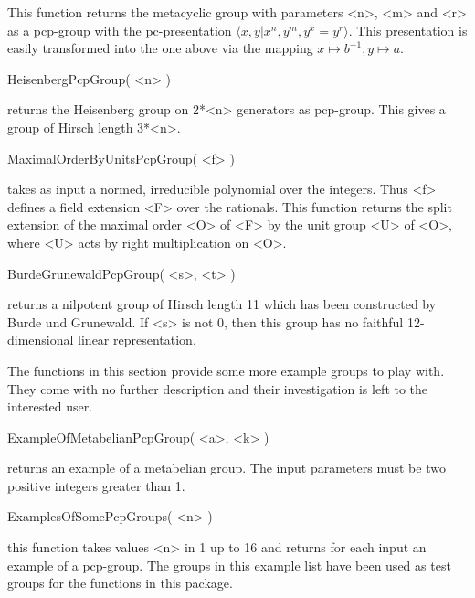       This function returns the metacyclic group with parameters <n>,
      <m> and <r> as a pcp-group with the pc-presentation $\langle
      x,y | x^n, y^m, y^x = y^r\rangle$.  This presentation is easily
      transformed into the one above via the mapping $x \mapsto b^{-1},
      y \mapsto a$. 

\>HeisenbergPcpGroup( <n> )

      returns the Heisenberg group on 2*<n> generators as pcp-group.
      This gives a group of Hirsch length 3*<n>.

\>MaximalOrderByUnitsPcpGroup( <f> )

      takes as input a normed, irreducible polynomial over the integers.
      Thus <f> defines a field extension <F> over the rationals. This 
      function returns the split extension of the maximal order <O> of <F> 
      by the unit group <U> of <O>, where <U> acts by right multiplication
      on <O>.

\>BurdeGrunewaldPcpGroup( <s>, <t> )
   
      returns a nilpotent group of Hirsch length 11 which has been 
      constructed by Burde und Grunewald. If <s> is not 0, then this 
      group has no faithful 12-dimensional linear representation.


The functions in this section provide some more example groups to play
with. They come with no further description and their investigation is
left to the interested user.

\>ExampleOfMetabelianPcpGroup( <a>, <k> )

      returns an example of a metabelian group. The input parameters must
      be two positive integers greater than 1.

\>ExamplesOfSomePcpGroups( <n> )

      this function takes values <n> in 1 up to 16 and returns for each 
      input an example of a pcp-group. The groups in this example list 
      have been used as test groups for the functions in this package.

